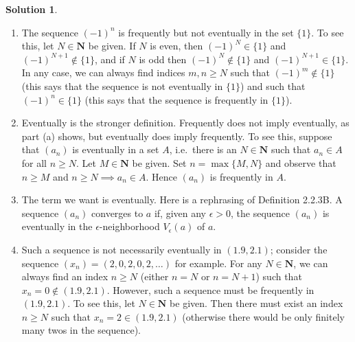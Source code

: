 \documentclass[12pt]{article}
\theoremstyle{definition}
\theoremstyle{exercise}
\theoremstyle{solution}
\newtheorem*{solution}{Solution}
\newcommand{\N}{\mathbf{N}}
\begin{document}
\begin{solution}
    \begin{enumerate}
        \item The sequence \( (-1)^n \) is frequently but not eventually in the set \( \{ 1 \} \). To see this, let \( N \in \N \) be given. If \( N \) is even, then \( (-1)^N \in \{ 1 \} \) and \( (-1)^{N+1} \not\in \{ 1 \} \), and if \( N \) is odd then \( (-1)^N \not\in \{ 1 \} \) and \( (-1)^{N+1} \in \{ 1 \} \). In any case, we can always find indices \( m, n \geq N \) such that \( (-1)^m \not\in \{ 1 \} \) (this says that the sequence is not eventually in \( \{ 1 \} \)) and such that \( (-1)^n \in \{ 1 \} \) (this says that the sequence is frequently in \( \{ 1 \} \)).

        \item Eventually is the stronger definition. Frequently does not imply eventually, as part (a) shows, but eventually does imply frequently. To see this, suppose that \( (a_n) \) is eventually in a set \( A \), i.e.\ there is an \( N \in \N \) such that \( a_n \in A \) for all \( n \geq N \). Let \( M \in \N \) be given. Set \( n = \max \{ M, N \} \) and observe that \( n \geq M \) and \( n \geq N \implies a_n \in A \). Hence \( (a_n) \) is frequently in \( A \).

        \item The term we want is eventually. Here is a rephrasing of Definition 2.2.3B. A sequence \( (a_n) \) converges to \( a \) if, given any \( \epsilon > 0 \), the sequence \( (a_n) \) is eventually in the \(\epsilon\)-neighborhood \( V_{\epsilon}(a) \) of \( a \).

        \item Such a sequence is not necessarily eventually in \( (1.9, 2.1) \); consider the sequence \( (x_n) = (2, 0, 2, 0, 2, \ldots) \) for example. For any \( N \in \N \), we can always find an index \( n \geq N \) (either \( n = N \) or \( n = N + 1 \)) such that \( x_n = 0 \not\in (1.9, 2.1) \). However, such a sequence must be frequently in \( (1.9, 2.1) \). To see this, let \( N \in \N \) be given. Then there must exist an index \( n \geq N \) such that \( x_n = 2 \in (1.9, 2.1) \) (otherwise there would be only finitely many twos in the sequence).
    \end{enumerate}
\end{solution}
\end{document}
